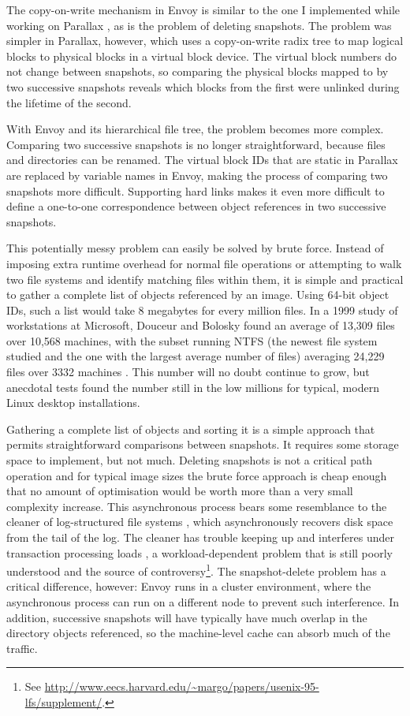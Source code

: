 The copy-on-write mechanism in Envoy is similar to the one I implemented while working on Parallax \cite{warfield}, as is the problem of deleting snapshots. The problem was simpler in Parallax, however, which uses a copy-on-write radix tree to map logical blocks to physical blocks in a virtual block device. The virtual block numbers do not change between snapshots, so comparing the physical blocks mapped to by two successive snapshots reveals which blocks from the first were unlinked during the lifetime of the second.

With Envoy and its hierarchical file tree, the problem becomes more complex. Comparing two successive snapshots is no longer straightforward, because files and directories can be renamed. The virtual block IDs that are static in Parallax are replaced by variable names in Envoy, making the process of comparing two snapshots more difficult. Supporting hard links makes it even more difficult to define a one-to-one correspondence between object references in two successive snapshots.

This potentially messy problem can easily be solved by brute force. Instead of imposing extra runtime overhead for normal file operations or attempting to walk two file systems and identify matching files within them, it is simple and practical to gather a complete list of objects referenced by an image. Using 64-bit object IDs, such a list would take 8 megabytes for every million files. In a 1999 study of workstations at Microsoft, Douceur and Bolosky found an average of 13,309 files over 10,568 machines, with the subset running NTFS (the newest file system studied and the one with the largest average number of files) averaging 24,229 files over 3332 machines \cite{douceur99}. This number will no doubt continue to grow, but anecdotal tests found the number still in the low millions for typical, modern Linux desktop installations.

Gathering a complete list of objects and sorting it is a simple approach that permits straightforward comparisons between snapshots. It requires some storage space to implement, but not much. Deleting snapshots is not a critical path operation and for typical image sizes the brute force approach is cheap enough that no amount of optimisation would be worth more than a very small complexity increase. This asynchronous process bears some resemblance to the cleaner of log-structured file systems \cite{rosenblum}, which asynchronously recovers disk space from the tail of the log. The cleaner has trouble keeping up and interferes under transaction processing loads \cite{seltzer93,seltzer95}, a workload-dependent problem that is still poorly understood and the source of controversy\footnote{See \url{http://www.eecs.harvard.edu/~margo/papers/usenix-95-lfs/supplement/}.}. The snapshot-delete problem has a critical difference, however: Envoy runs in a cluster environment, where the asynchronous process can run on a different node to prevent such interference. In addition, successive snapshots will have typically have much overlap in the directory objects referenced, so the machine-level cache can absorb much of the traffic.

